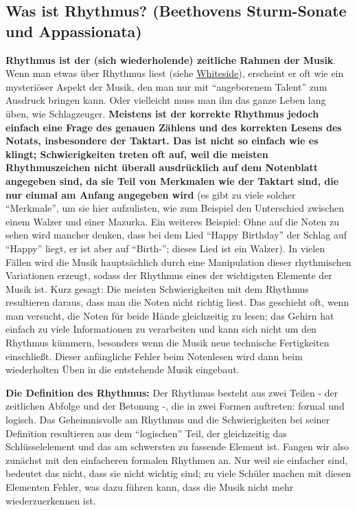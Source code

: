 \subsection{Was ist Rhythmus? (Beethovens Sturm-Sonate und Appassionata)}
\label{c1iii1b}

\textbf{Rhythmus ist der (sich wiederholende) zeitliche Rahmen der Musik}.
Wenn man etwas über Rhythmus liest (siehe \hyperref[Whiteside]{Whiteside}), erscheint er oft wie ein mysteriöser Aspekt der Musik, den man nur mit \enquote{angeborenem Talent} zum Ausdruck bringen kann.
Oder vielleicht muss man ihn das ganze Leben lang üben, wie Schlagzeuger.
\textbf{Meistens ist der korrekte Rhythmus jedoch einfach eine Frage des genauen Zählens und des korrekten Lesens des Notats, insbesondere der Taktart.
Das ist nicht so einfach wie es klingt; Schwierigkeiten treten oft auf, weil die meisten Rhythmuszeichen nicht überall ausdrücklich auf dem Notenblatt angegeben sind, da sie Teil von Merkmalen wie der Taktart sind, die nur einmal am Anfang angegeben wird} (es gibt zu viele solcher \enquote{Merkmale}, um sie hier aufzulisten, wie zum Beispiel den Unterschied zwischen einem Walzer und einer Mazurka.
Ein weiteres Beispiel: Ohne auf die Noten zu sehen wird mancher denken, dass bei dem Lied \enquote{Happy Birthday} der Schlag auf \enquote{Happy} liegt, er ist aber auf \enquote{Birth-}; dieses Lied ist ein Walzer).
In vielen Fällen wird die Musik hauptsächlich durch eine Manipulation dieser rhythmischen Variationen erzeugt, sodass der Rhythmus eines der wichtigsten Elemente der Musik ist.
Kurz gesagt: Die meisten Schwierigkeiten mit dem Rhythmus resultieren daraus, dass man die Noten nicht richtig liest.
Das geschieht oft, wenn man versucht, die Noten für beide Hände gleichzeitig zu lesen; das Gehirn hat einfach zu viele Informationen zu verarbeiten und kann sich nicht um den Rhythmus kümmern, besonders wenn die Musik neue technische Fertigkeiten einschließt.
Dieser anfängliche Fehler beim Notenlesen wird dann beim wiederholten Üben in die entstehende Musik eingebaut.

\textbf{Die Definition des Rhythmus:}
Der Rhythmus besteht aus zwei Teilen - der zeitlichen Abfolge und der Betonung -, die in zwei Formen auftreten: formal und logisch.
Das Geheimnisvolle am Rhythmus und die Schwierigkeiten bei seiner Definition resultieren aus dem \enquote{logischen} Teil, der gleichzeitig das Schlüsselelement und das am schwersten zu fassende Element ist.
Fangen wir also zunächst mit den einfacheren formalen Rhythmen an.
Nur weil sie einfacher sind, bedeutet das nicht, dass sie nicht wichtig sind; zu viele Schüler machen mit diesen Elementen Fehler, was dazu führen kann, dass die Musik nicht mehr wiederzuerkennen ist.

